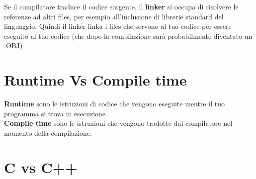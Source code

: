 \textsf{\small Se il compilatore traduce il codice sorgente, il \textbf{linker} si occupa di risolvere le referenze ad altri files, per esempio all'inclusione di librerie standard del linguaggio. Quindi il linker linka i files che servono al tuo codice per essere eseguito al tuo codice (che dopo la compilazione sarà probabilmente diventato un .OBJ)} \\



\section{Runtime Vs Compile time}

\textsf{\small \textbf{Runtime} sono le istruzioni di codice che vengono eseguite mentre il tuo programma si trova in esecuzione.} \\

\textsf{\small \textbf{Compile time} sono le istruzioni che vengono tradotte dal compilatore nel momento della compilazione.} \\


\newpage

\section{C vs C++}

